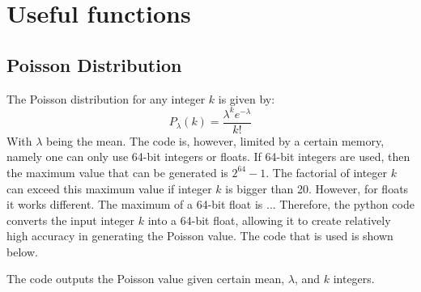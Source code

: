 \section{Useful functions}
\subsection{Poisson Distribution}
The Poisson distribution for any integer $k$ is given by:
\begin{equation}
P_{\lambda}(k) = \frac{\lambda^k e^{-\lambda}}{k!}
\end{equation}
With $\lambda$ being the mean. The code is, however, limited by a certain memory, namely one can only use 64-bit integers or floats. If 64-bit integers are used, then the maximum value that can be generated is $2^{64} - 1$. The factorial of integer $k$ can exceed this maximum value if integer $k$ is bigger than 20. However, for floats it works different.  The maximum of a 64-bit float is ... %
Therefore, the python code converts the input integer $k$ into a 64-bit float, allowing it to create relatively high accuracy in generating the Poisson value. The code that is used is shown below. 



\newpage
The code outputs the Poisson value given certain mean, $\lambda$, and $k$ integers.

